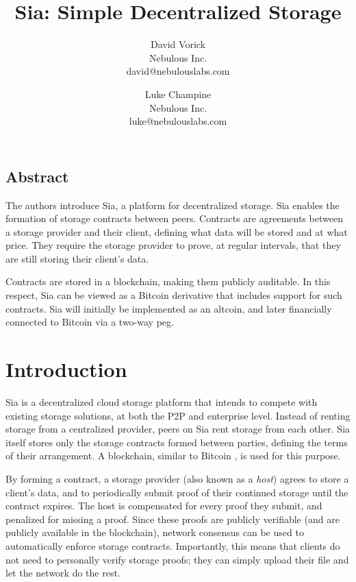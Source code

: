 \documentclass[twocolumn]{article}
\begin{document}
\frenchspacing

\title{Sia: Simple Decentralized Storage}

\author{
{\rm David Vorick}\\
Nebulous Inc.\\
david@nebulouslabs.com
\and
{\rm Luke Champine}\\
Nebulous Inc.\\
luke@nebulouslabs.com
}

\maketitle

\subsection*{Abstract}
The authors introduce Sia, a platform for decentralized storage.
Sia enables the formation of storage contracts between peers.
Contracts are agreements between a storage provider and their client, defining what data will be stored and at what price.
They require the storage provider to prove, at regular intervals, that they are still storing their client's data.

Contracts are stored in a blockchain, making them publicly auditable.
In this respect, Sia can be viewed as a Bitcoin derivative that includes support for such contracts.
Sia will initially be implemented as an altcoin, and later financially connected to Bitcoin via a two-way peg.

\section{Introduction}
Sia is a decentralized cloud storage platform that intends to compete with existing storage solutions, at both the P2P and enterprise level.
Instead of renting storage from a centralized provider, peers on Sia rent storage from each other.
Sia itself stores only the storage contracts formed between parties, defining the terms of their arrangement.
A blockchain, similar to Bitcoin \cite{btc, btcdg}, is used for this purpose.

By forming a contract, a storage provider (also known as a \textit{host}) agrees to store a client's data, and to periodically submit proof of their continued storage until the contract expires.
The host is compensated for every proof they submit, and penalized for missing a proof.
Since these proofs are publicly verifiable (and are publicly available in the blockchain), network consensus can be used to automatically enforce storage contracts.
Importantly, this means that clients do not need to personally verify storage proofs; they can simply upload their file and let the network do the rest.
\end{document}
